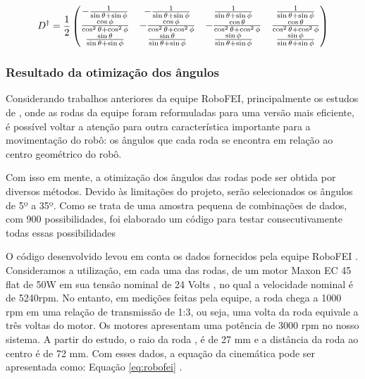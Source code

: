 \documentclass[deposito, acronym, symbols]{fei}
\begin{document}
\begin{equation} \label{eq:cininversa}
\centering  
D^\dagger = \frac{1}{2}
\begin{pmatrix}
    -\frac{1}{\sin\theta+\sin\phi} & -\frac{1}{\sin\theta+\sin\phi} & \frac{1}{\sin\theta+\sin\phi} & \frac{1}{\sin\theta+\sin\phi} \\
    \frac{\cos\phi}{\cos^2\theta+\cos^2\phi} & -\frac{\cos\phi}{\cos^2\theta+\cos^2\phi} & -\frac{\cos\theta}{\cos^2\theta+\cos^2\phi} & \frac{\cos\theta}{\cos^2\theta+\cos^2\phi} \\
    \frac{\sin\theta}{\sin\theta+\sin\phi} & \frac{\sin\theta}{\sin\theta+\sin\phi} & \frac{\sin\phi}{\sin\theta+\sin\phi} & \frac{\sin\phi}{\sin\theta+\sin\phi} 
\end{pmatrix}
\end{equation}

\subsubsection{Resultado da otimização dos ângulos}

Considerando trabalhos anteriores da equipe RoboFEI, principalmente os estudos de \textcite{joaorobofei}, onde as rodas da  equipe foram reformuladas para uma versão mais eficiente, é possível voltar a atenção para outra característica importante para a movimentação do robô: os ângulos que cada roda se encontra em relação ao centro geométrico do robô.

Com isso em mente, a otimização dos ângulos das rodas pode ser obtida por diversos métodos. Devido às limitações do projeto, serão selecionados os ângulos de 5º a 35º. Como se trata de uma amostra pequena de combinações de dados, com 900 possibilidades, foi elaborado um código para testar consecutivamente todas essas possibilidades

O código desenvolvido levou em conta os dados fornecidos pela equipe RoboFEI \cite{robofei2023}. Consideramos a utilização, em cada uma das rodas, de um motor Maxon EC 45 flat de 50W em sua tensão nominal de 24 Volts \cite{curvacorrente},  no qual a velocidade nominal é de 5240rpm. No entanto, em medições feitas pela equipe, a roda chega a 1000 rpm em uma relação de transmissão de 1:3, ou seja, uma volta da roda equivale a três voltas do motor. Os motores apresentam uma potência de 3000 rpm no nosso sistema. A partir do estudo\textcite{joaorobofei}, o raio da roda , é de 27 mm e a distância da roda ao centro é de 72 mm. Com esses dados, a equação da cinemática pode ser apresentada como: Equação \ref{eq:robofei} .
\end{document}
